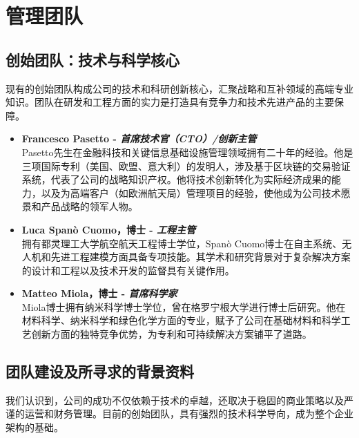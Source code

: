 \documentclass[11点, A4纸, 单面]{article}
\begin{document}
\newpage
\section{管理团队}

\subsection{创始团队：技术与科学核心}

现有的创始团队构成公司的技术和科研创新核心，汇聚战略和互补领域的高端专业知识。团队在研发和工程方面的实力是打造具有竞争力和技术先进产品的主要保障。

\begin{itemize}
    \item \textbf{Francesco Pasetto - \textit{首席技术官（CTO）/创新主管}} \\
    Pasetto先生在金融科技和关键信息基础设施管理领域拥有二十年的经验。他是三项国际专利（美国、欧盟、意大利）的发明人，涉及基于区块链的交易验证系统，代表了公司的战略知识产权。他将技术创新转化为实际经济成果的能力，以及为高端客户（如欧洲航天局）管理项目的经验，使他成为公司技术愿景和产品战略的领军人物。

    \item \textbf{Luca Spanò Cuomo，博士 - \textit{工程主管}} \\
    拥有都灵理工大学航空航天工程博士学位，Spanò Cuomo博士在自主系统、无人机和先进工程建模方面具备专项技能。其学术和研究背景对于复杂解决方案的设计和工程以及技术开发的监督具有关键作用。

    \item \textbf{Matteo Miola，博士 - \textit{首席科学家}} \\
    Miola博士拥有纳米科学博士学位，曾在格罗宁根大学进行博士后研究。他在材料科学、纳米科学和绿色化学方面的专业，赋予了公司在基础材料和科学工艺创新方面的独特竞争优势，为专利和可持续解决方案铺平了道路。
\end{itemize}



\subsection{团队建设及所寻求的背景资料}

我们认识到，公司的成功不仅依赖于技术的卓越，还取决于稳固的商业策略以及严谨的运营和财务管理。目前的创始团队，具有强烈的技术科学导向，成为整个企业架构的基础。
\end{document}
